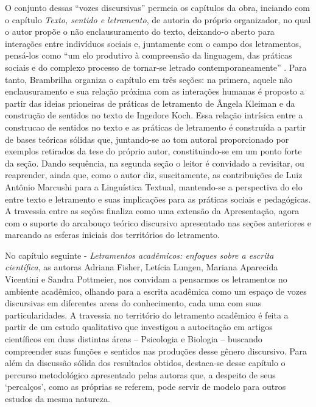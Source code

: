 \documentclass[portuguese]{textolivre}
\begin{document}
O conjunto dessas “vozes discursivas” permeia os capítulos da obra, inciando com o capítulo \textit{Texto, sentido e letramento}, de autoria do próprio organizador,  no qual o autor \cite{brambila2024texto} propõe o não enclausuramento do texto, deixando-o aberto para interações entre indivíduos sociais e, juntamente com o campo dos letramentos, pensá-los como “um elo produtivo à compreensão da linguagem, das práticas sociais e do complexo processo de tornar-se letrado contemporaneamente” \cite[p. 13]{brambila2024texto}. Para tanto, Brambrilha organiza o capítulo em três seções: na primera, aquele não enclausuramento e sua relação próxima com as interações humanas é proposto a partir das ideias prioneiras de práticas de letramento de Ângela Kleiman e da construção de sentidos no texto de Ingedore Koch. Essa relação intrísica entre a construcao de sentidos no texto e as práticas de letramento é construída a partir de bases teóricas sólidas que, juntando-se ao tom autoral proporcionado por exemplos retirados da tese do próprio autor, constituindo-se em um ponto forte da seção. Dando sequência, na segunda seção o leitor é convidado a revisitar, ou reaprender, ainda que, como o autor diz, suscitamente, as contribuições de Luiz Antônio Marcushi para a Linguística Textual, mantendo-se a perspectiva do elo entre texto e letramento e suas implicações para as práticas sociais e pedagógicas.  A travessia entre as seções finaliza como uma extensão da Apresentação, agora com o suporte do arcabouço teórico discursivo apresentado nas seções anteriores e marcando as esferas iniciais dos territórios do letramento.

No capítulo seguinte  - \textit{Letramentos acadêmicos: enfoques sobre a escrita científica}, as autoras Adriana Fisher, Letícia Lungen, Mariana Aparecida Vicentini e Sandra Pottmeier, nos convidam a pensarmos os letramentos no ambiente acadêmico, olhando para a escrita acadêmica como um espaço de vozes discursivas em diferentes areas do conhecimento, cada uma com suas particularidades. A travessia no território do letramento acadêmico é feita a partir de um estudo qualitativo que investigou a autocitação em artigos científicos em duas distintas áreas – Psicologia e Biologia – buscando compreender suas funções e sentidos nas produções desse gênero discursivo. Para além da discussão sólida dos resultados obtidos, destaca-se desse capítulo o percurso metodológico apresentado pelas autoras que, a despeito de seus ‘percalços’, como as próprias se referem, pode servir de modelo para outros estudos da mesma natureza.
\end{document}
